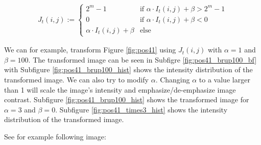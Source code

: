 \documentclass[pdftex,12pt,a4paper]{report}
\begin{document}
\begin{gather*}
J_t(i, j) :=
\begin{cases}
  2^m - 1 & \text{if } \alpha \cdot I_t(i, j) + \beta > 2^m - 1\\
  0 & \text{if } \alpha \cdot I_t(i, j) + \beta < 0\\
  \alpha \cdot I_t(i, j) + \beta & \text{else}
\end{cases}
\end{gather*}

We can for example, transform Figure \ref{fig:pos41} using $J_t(i, j)$ with $\alpha = 1$ and $\beta=100$. The transformed image can be seen in Subfigre \ref{fig:pos41_brup100_bf} with Subfigure \ref{fig:pos41_brup100_hist} shows the intensity distribution of the transformed image. We can also try to modify $\alpha$. Changing $\alpha$ to a value larger than 1 will scale the image's intensity and emphasize/de-emphasize image contrast. Subfigure \ref{fig:pos41_brup100_hist} shows the transformed image for $\alpha = 3$ and $\beta  = 0$. Subfigure \ref{fig:pos41_times3_hist} shows the intensity distribution of the transformed image.

See for example following image:
\end{document}
